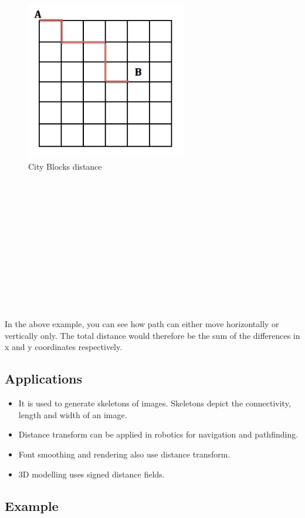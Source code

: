 \documentclass[]{article}
\providecommand{\tightlist}{%
  \setlength{\itemsep}{0pt}\setlength{\parskip}{0pt}}
\begin{document}
\begin{figure}[htbp]
\centering
\includegraphics[width = 7cm]{images/Distance Transform/Images/City blocks Distance.png}
\caption{City Blocks distance}
\end{figure}
~\\ \\ \\ \\ \\ \\ \\ \\ \\ \\ \\ \\
In the above example, you can see how path can either move horizontally
or vertically only. The total distance would therefore be the sum of the
differences in x and y coordinates respectively.

\subsection{Applications}\label{applications}

\begin{itemize}
\tightlist
\item
  It is used to generate skeletons of images. Skeletons depict the
  connectivity, length and width of an image.
\item
  Distance transform can be applied in robotics for navigation and
  pathfinding.
\item
  Font smoothing and rendering also use distance transform.
\item
  3D modelling uses signed distance fields.
\end{itemize}

\subsection{Example}\label{example}
\end{document}
